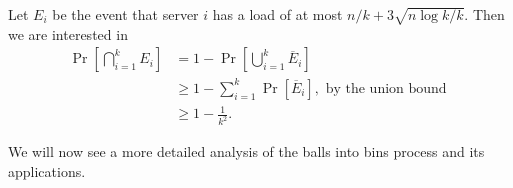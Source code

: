 Let $E_i$ be the event that server $i$ has a load of at most $n/k + 3\sqrt{n\log k/k}$. Then we are interested in 
\begin{align*}
	\Pr\left[ \bigcap_{i=1}^k E_i \right] &= 1 - \Pr\left[ \bigcup_{i=1}^k \overline{E}_i \right]\\
	& \geq 1 - \sum_{i=1}^k \Pr[\overline{E}_i], \text{ by the union bound }\\
	& \geq 1 - \frac{1}{k^2}.
\end{align*}

We will now see a more detailed analysis of the balls into bins process and its applications.